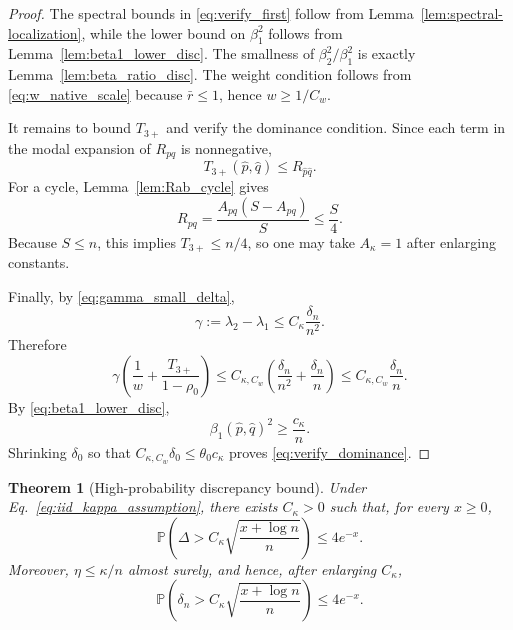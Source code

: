\documentclass[11pt]{article}
\numberwithin{equation}{section}
\newtheorem{theorem}{Theorem}[section]
\theoremstyle{definition}
\theoremstyle{remark}
\newcommand{\Prob}{\mathbb{P}}
\begin{document}
\begin{proof}
	The spectral bounds in \eqref{eq:verify_first} follow from
	Lemma~\ref{lem:spectral-localization}, while the lower bound on
	$\beta_1^2$ follows from Lemma~\ref{lem:beta1_lower_disc}. The smallness
	of $\beta_2^2/\beta_1^2$ is exactly
	Lemma~\ref{lem:beta_ratio_disc}. The weight condition follows from
	\eqref{eq:w_native_scale} because $\bar r\le 1$, hence
	$w\ge 1/C_w$.
	
	It remains to bound $T_{3+}$ and verify the dominance condition. Since
	each term in the modal expansion of $R_{pq}$ is nonnegative,
	\[
	T_{3+}(\widehat p,\widehat q)\le R_{\widehat p\widehat q}.
	\]
	For a cycle, Lemma~\ref{lem:Rab_cycle} gives
	\[
	R_{pq}=\frac{A_{pq}(S-A_{pq})}{S}\le \frac{S}{4}.
	\]
	Because $S\le n$, this implies $T_{3+}\le n/4$, so one may take
	$A_\kappa=1$ after enlarging constants.
	
	Finally, by \eqref{eq:gamma_small_delta},
	\[
	\gamma:=\lambda_2-\lambda_1\le C_\kappa\frac{\delta_n}{n^2}.
	\]
	Therefore
	\[
	\gamma\left(
	\frac1w+\frac{T_{3+}}{1-\rho_0}
	\right)
	\le
	C_{\kappa,C_w}\left(
	\frac{\delta_n}{n^2}+\frac{\delta_n}{n}
	\right)
	\le
	C_{\kappa,C_w}\frac{\delta_n}{n}.
	\]
	By \eqref{eq:beta1_lower_disc},
	\[
	\beta_1(\widehat p,\widehat q)^2\ge \frac{c_\kappa}{n}.
	\]
	Shrinking $\delta_0$ so that
	$C_{\kappa,C_w}\delta_0\le \theta_0 c_\kappa$ proves
	\eqref{eq:verify_dominance}.
\end{proof}


\begin{theorem}[High-probability discrepancy bound]\label{thm:discrepancy_iid_kappa}
	Under Eq.~\eqref{eq:iid_kappa_assumption}, there exists $C_\kappa>0$
	such that, for every $x\ge 0$,
	\begin{equation}\label{eq:Delta_prob_kappa}
		\Prob\left(
		\Delta>C_\kappa\sqrt{\frac{x+\log n}{n}}
		\right)\le 4e^{-x}.
	\end{equation}
	Moreover, $\eta\le \kappa/n$ almost surely, and hence, after enlarging
	$C_\kappa$,
	\begin{equation}\label{eq:delta_prob_kappa}
		\Prob\left(
		\delta_n>C_\kappa\sqrt{\frac{x+\log n}{n}}
		\right)\le 4e^{-x}.
	\end{equation}
\end{theorem}
\end{document}
